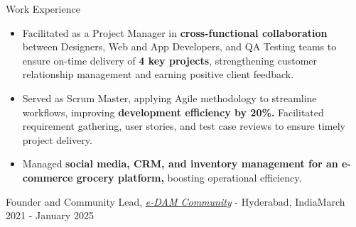 \documentclass{resume} %
\begin{document}
\begin{rSection}{Work Experience}
\begin{rSubsection}
\item[]
\begin{itemize}[left=-1.5em, labelsep=.1cm, labelwidth=.2cm, itemsep=0.0em]
\item Facilitated as a Project Manager in\textbf{ cross-functional collaboration} between Designers, Web and App Developers, and QA Testing teams to ensure on-time delivery of\textbf{ 4 key projects}, strengthening customer relationship management and earning positive client feedback.
\item Served as Scrum Master, applying Agile methodology to streamline workflows, improving \textbf{development efficiency by 20\%.} Facilitated requirement gathering, user stories, and test case reviews to ensure timely project delivery.
\item Managed \textbf{social media, CRM, and inventory management for an e-commerce grocery platform,} boosting operational efficiency.
\end{itemize}
\end{rSubsection}

\begin{rSubsection}
{Founder and Community Lead, \href{https://www.abhishekn.in/e-dam}{\textit{e-DAM Community}} - Hyderabad, India}{March 2021 - January 2025}{}{}

\item[]
\begin{itemize}[left=-1.5em, labelsep=.1cm, labelwidth=.2cm, itemsep=0.0em]


\end{itemize}
\end{rSubsection}
\end{rSection}
\end{document}
